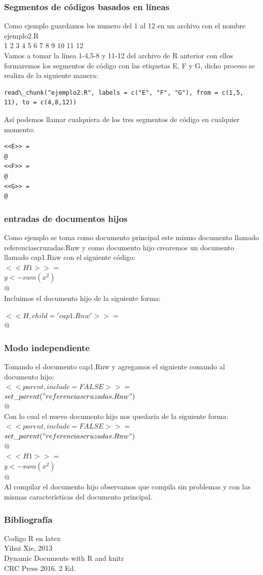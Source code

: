 \documentclass[10pt]{beamer}\usepackage[]{graphicx}\usepackage[]{color}
\begin{document}
\begin{frame}[fragile]
\frametitle{Segmentos de códigos basados en líneas}
Como ejemplo guardamos los numero del 1 al 12 en un archivo con el nombre ejemplo2.R\\
1 2 3 4 5 6 7 8 9 10 11 12 \\
Vamos a tomar la línea 1-4,5-8 y 11-12 del archivo de R anterior con ellos formaremos los segmentos de código con las etiquetas E, F y G, dicho proceso se realiza de la siguiente manera:\\ 
\begin{lstlisting}
read\_chunk("ejemplo2.R", labels = c("E", "F", "G"), from = c(1,5, 11), to = c(4,8,12))
\end{lstlisting}

Así podemos llamar cualquiera de los tres segmentos de código en cualquier momento:\\ 
\begin{lstlisting}
<<E>> =
@
<<F>> =
@
<<G>> =
@
\end{lstlisting}
\end{frame}


\begin{frame}
\frametitle{entradas de documentos hijos}
Como ejemplo se toma como documento principal este mismo documento llamado referenciascruzadas.Rnw y como documento hijo crearemos un documento llamado cap1.Rnw con el siguiente código: \\ 

$<<H1>> =$\\
$y<-sum(x^2)$\\
$@$\\

Incluimos el documento hijo de la siguiente forma:

$<<H, child='cap1.Rnw'>>=$\\
$@$\\

\end{frame}

\begin{frame}
\frametitle{Modo independiente}
Tomando el documento cap1.Rnw y agregamos el siguiente comando al documento hijo: \\

$<<parent, include=FALSE>>=$\\
$set\_parent("referenciascruzadas.Rnw ")$\\
$@$\\
Con lo cual el nuevo documento hijo nos quedaría de la siguiente forma: \\ 
$<<parent, include=FALSE>>=$\\
$set\_parent("referenciascruzadas.Rnw ")$\\
$@$\\
$<<H1>>=$\\
$y <- sum(x^2)$\\
$@$\\

 Al compilar el documento hijo observamos que compila sin problemas y con las mismas características del documento principal.
  
\end{frame}


\begin{frame}
\frametitle{Bibliografía}
Codigo R en latex\\
Yihui Xie, 2013\\
Dynamic Documents with R and knitr\\
CRC Press 2016. 2 Ed.\\
\end{frame}
\end{document}
